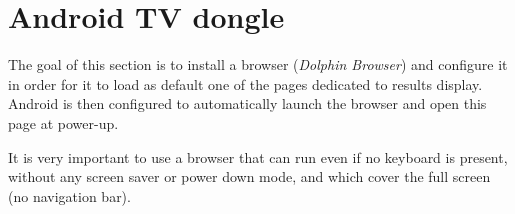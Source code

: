 \documentclass[a4paper]{ffco-rapport}
\begin{document}
\chapter{Android TV dongle}

	The goal of this section is to install a browser (\emph{Dolphin Browser}) and configure it in order for it to load as default one of the pages dedicated to results display. Android is then configured to automatically launch the browser and open this page at power-up.
	
	It is very important to use a browser that can run even if no keyboard is present, without any screen saver or power down mode, and which cover the full screen (no navigation bar).
	
	\newcommand{\ico}[1]{\texttt{[image: icone\#1.jpg]}}
	
\end{document}
